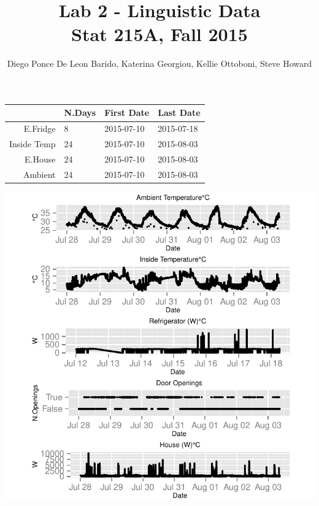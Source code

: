\documentclass[11pt]{article}\usepackage[]{graphicx}\usepackage[]{color}
\title{Lab 2 - Linguistic Data\\
  Stat 215A, Fall 2015}
\author{Diego Ponce De Leon Barido, Katerina Georgiou, Kellie Ottoboni, Steve Howard}
\makeatletter
\def\maxwidth{ %
  \ifdim\Gin@nat@width>\linewidth
    \linewidth
  \else
    \Gin@nat@width
  \fi
}
\newenvironment{knitrout}{}{} %
\makeatother
\begin{document}
\begin{table}[ht]
\centering
\begin{tabular}{rlll}
  \hline
 & N.Days & First Date & Last Date \\ 
  \hline
E.Fridge & 8 & 2015-07-10 & 2015-07-18 \\ 
  Inside Temp & 24 & 2015-07-10 & 2015-08-03 \\ 
  E.House & 24 & 2015-07-10 & 2015-08-03 \\ 
  Ambient & 24 & 2015-07-10 & 2015-08-03 \\ 
   \hline
\end{tabular}
\end{table}






\begin{knitrout}
\color{fgcolor}

\includegraphics[width=\maxwidth]{figure/timeseriesplotsetup-1} \hfill{}



\end{knitrout}
\end{document}
